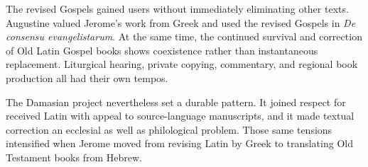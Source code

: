 The revised Gospels gained users without immediately eliminating other texts. Augustine valued Jerome's work from Greek and used the revised Gospels in \emph{De consensu evangelistarum}. At the same time, the continued survival and correction of Old Latin Gospel books shows coexistence rather than instantaneous replacement. Liturgical hearing, private copying, commentary, and regional book production all had their own tempos.

The Damasian project nevertheless set a durable pattern. It joined respect for received Latin with appeal to source-language manuscripts, and it made textual correction an ecclesial as well as philological problem. Those same tensions intensified when Jerome moved from revising Latin by Greek to translating Old Testament books from Hebrew.
